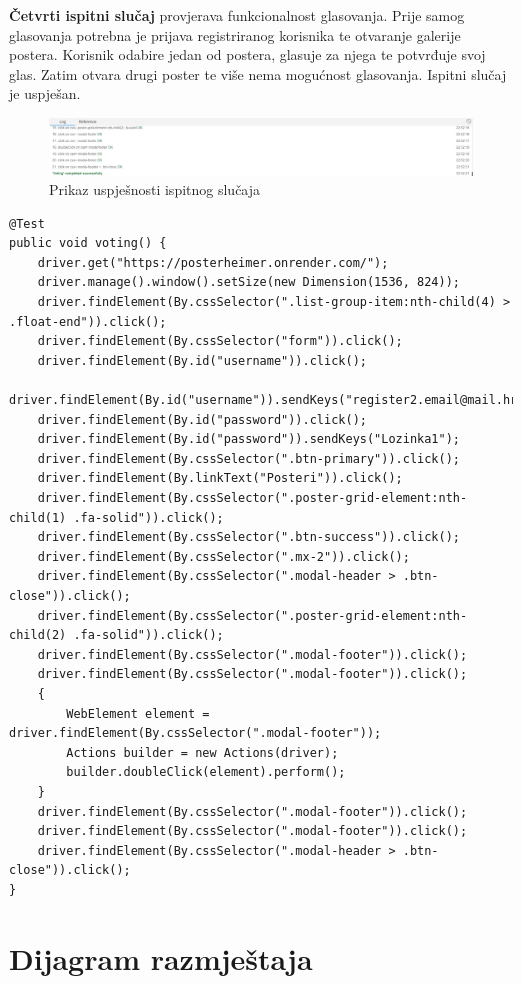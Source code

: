 		\textbf{Četvrti ispitni slučaj} provjerava funkcionalnost glasovanja. Prije samog glasovanja potrebna je prijava registriranog korisnika te otvaranje galerije postera. Korisnik odabire jedan od postera, glasuje za njega te potvrđuje svoj glas. Zatim otvara drugi poster te više nema mogućnost glasovanja. Ispitni slučaj je uspješan.
		\begin{figure} [hbt!]
			\includegraphics[width=\linewidth]{Slike/votingTest}
			\caption{Prikaz uspješnosti ispitnog slučaja}
		\end{figure}
		
		\begin{lstlisting}
@Test
public void voting() {
	driver.get("https://posterheimer.onrender.com/");
	driver.manage().window().setSize(new Dimension(1536, 824));
	driver.findElement(By.cssSelector(".list-group-item:nth-child(4) > .float-end")).click();
	driver.findElement(By.cssSelector("form")).click();
	driver.findElement(By.id("username")).click();
	driver.findElement(By.id("username")).sendKeys("register2.email@mail.hr");
	driver.findElement(By.id("password")).click();
	driver.findElement(By.id("password")).sendKeys("Lozinka1");
	driver.findElement(By.cssSelector(".btn-primary")).click();
	driver.findElement(By.linkText("Posteri")).click();
	driver.findElement(By.cssSelector(".poster-grid-element:nth-child(1) .fa-solid")).click();
	driver.findElement(By.cssSelector(".btn-success")).click();
	driver.findElement(By.cssSelector(".mx-2")).click();
	driver.findElement(By.cssSelector(".modal-header > .btn-close")).click();
	driver.findElement(By.cssSelector(".poster-grid-element:nth-child(2) .fa-solid")).click();
	driver.findElement(By.cssSelector(".modal-footer")).click();
	driver.findElement(By.cssSelector(".modal-footer")).click();
	{
		WebElement element = driver.findElement(By.cssSelector(".modal-footer"));
		Actions builder = new Actions(driver);
		builder.doubleClick(element).perform();
	}
	driver.findElement(By.cssSelector(".modal-footer")).click();
	driver.findElement(By.cssSelector(".modal-footer")).click();
	driver.findElement(By.cssSelector(".modal-header > .btn-close")).click();
}
		\end{lstlisting}
			
			\eject 
		
		
		\section{Dijagram razmještaja}
			 
